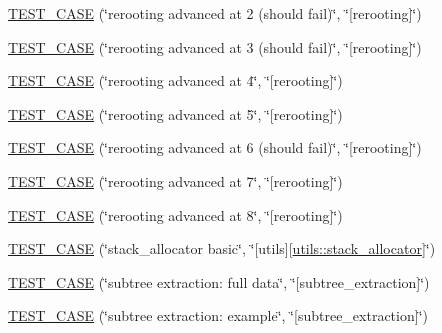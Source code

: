 \begin{DoxyCompactItemize}
\item 
\hyperlink{namespaceterraces_1_1tests_a7c7bda6ee7c37d0967003fe7935934ac}{T\+E\+S\+T\+\_\+\+C\+A\+SE} (\char`\"{}rerooting advanced at 2 (should fail)\char`\"{}, \char`\"{}\mbox{[}rerooting\mbox{]}\char`\"{})
\item 
\hyperlink{namespaceterraces_1_1tests_a64d9f55f3bb21977bb4c971d847e4907}{T\+E\+S\+T\+\_\+\+C\+A\+SE} (\char`\"{}rerooting advanced at 3 (should fail)\char`\"{}, \char`\"{}\mbox{[}rerooting\mbox{]}\char`\"{})
\item 
\hyperlink{namespaceterraces_1_1tests_af30118b07d6ab64cf280e54d01f99566}{T\+E\+S\+T\+\_\+\+C\+A\+SE} (\char`\"{}rerooting advanced at 4\char`\"{}, \char`\"{}\mbox{[}rerooting\mbox{]}\char`\"{})
\item 
\hyperlink{namespaceterraces_1_1tests_aed7e05ed35b8fde80ae2b916cacbbfd4}{T\+E\+S\+T\+\_\+\+C\+A\+SE} (\char`\"{}rerooting advanced at 5\char`\"{}, \char`\"{}\mbox{[}rerooting\mbox{]}\char`\"{})
\item 
\hyperlink{namespaceterraces_1_1tests_aacdd08368b6df252508a676552252d4d}{T\+E\+S\+T\+\_\+\+C\+A\+SE} (\char`\"{}rerooting advanced at 6 (should fail)\char`\"{}, \char`\"{}\mbox{[}rerooting\mbox{]}\char`\"{})
\item 
\hyperlink{namespaceterraces_1_1tests_ac3f9f6c569f089f3ac339eb68576cdfe}{T\+E\+S\+T\+\_\+\+C\+A\+SE} (\char`\"{}rerooting advanced at 7\char`\"{}, \char`\"{}\mbox{[}rerooting\mbox{]}\char`\"{})
\item 
\hyperlink{namespaceterraces_1_1tests_a6c36b35af3f670bdc0528bee8e0d482e}{T\+E\+S\+T\+\_\+\+C\+A\+SE} (\char`\"{}rerooting advanced at 8\char`\"{}, \char`\"{}\mbox{[}rerooting\mbox{]}\char`\"{})
\item 
\hyperlink{namespaceterraces_1_1tests_a1c518dc81e3ec1722da9f6e13d135a00}{T\+E\+S\+T\+\_\+\+C\+A\+SE} (\char`\"{}stack\+\_\+allocator basic\char`\"{}, \char`\"{}\mbox{[}utils\mbox{]}\mbox{[}\hyperlink{classterraces_1_1utils_1_1stack__allocator}{utils\+::stack\+\_\+allocator}\mbox{]}\char`\"{})
\item 
\hyperlink{namespaceterraces_1_1tests_a12fc00cd878f7c90703839206ef2e8f3}{T\+E\+S\+T\+\_\+\+C\+A\+SE} (\char`\"{}subtree extraction\+: full data\char`\"{}, \char`\"{}\mbox{[}subtree\+\_\+extraction\mbox{]}\char`\"{})
\item 
\hyperlink{namespaceterraces_1_1tests_a652f98a612bf94c54e9e18c1de80d3b9}{T\+E\+S\+T\+\_\+\+C\+A\+SE} (\char`\"{}subtree extraction\+: example\char`\"{}, \char`\"{}\mbox{[}subtree\+\_\+extraction\mbox{]}\char`\"{})
\item 

\end{DoxyCompactItemize}
